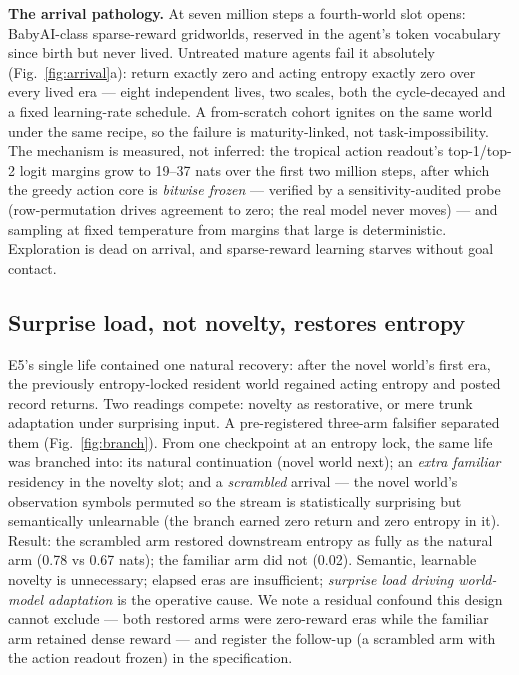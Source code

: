 \documentclass[sn-nature]{sn-jnl}
\begin{document}
\textbf{The arrival pathology.} At seven million steps a fourth-world slot
opens: BabyAI-class sparse-reward gridworlds, reserved in the agent's token
vocabulary since birth but never lived. Untreated mature agents fail it
absolutely (Fig.~\ref{fig:arrival}a): return exactly zero and acting entropy
exactly zero over every lived era --- eight independent lives, two scales,
both the cycle-decayed and a fixed learning-rate schedule. A from-scratch
cohort ignites on the same world under the same recipe, so the failure is
maturity-linked, not task-impossibility. The mechanism is measured, not
inferred: the tropical action readout's top-1/top-2 logit margins grow to
19--37 nats over the first two million steps, after which the greedy action
core is \emph{bitwise frozen} --- verified by a sensitivity-audited probe
(row-permutation drives agreement to zero; the real model never moves) ---
and sampling at fixed temperature from margins that large is deterministic.
Exploration is dead on arrival, and sparse-reward learning starves without
goal contact.

\subsection*{Surprise load, not novelty, restores entropy}

E5's single life contained one natural recovery: after the novel world's
first era, the previously entropy-locked resident world regained acting
entropy and posted record returns. Two readings compete: novelty as
restorative, or mere trunk adaptation under surprising input. A
pre-registered three-arm falsifier separated them
(Fig.~\ref{fig:branch}). From one checkpoint at an entropy lock, the same
life was branched into: its natural continuation (novel world next); an
\emph{extra familiar} residency in the novelty slot; and a
\emph{scrambled} arrival --- the novel world's observation symbols permuted
so the stream is statistically surprising but semantically unlearnable (the
branch earned zero return and zero entropy in it). Result: the scrambled arm
restored downstream entropy as fully as the natural arm (0.78 vs 0.67 nats);
the familiar arm did not (0.02). Semantic, learnable novelty is unnecessary;
elapsed eras are insufficient; \emph{surprise load driving world-model
adaptation} is the operative cause. We note a residual confound this design
cannot exclude --- both restored arms were zero-reward eras while the
familiar arm retained dense reward --- and register the follow-up
(a scrambled arm with the action readout frozen) in the specification.
\end{document}
